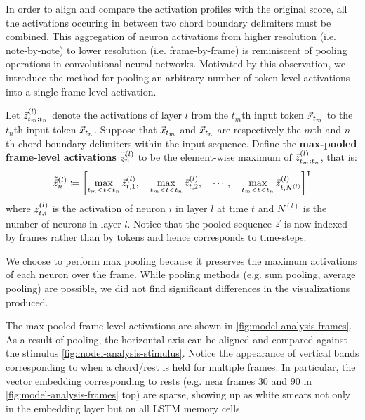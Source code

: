 In order to align and compare the activation profiles with the original score,
all the activations occuring in between two chord boundary delimiters must be
combined. This aggregation of neuron activations from higher resolution (i.e.
note-by-note) to lower resolution (i.e. frame-by-frame) is reminiscent of
pooling operations in convolutional neural networks. Motivated by
this observation, we introduce the method for pooling an arbitrary number of
token-level activations into a single frame-level activation.

Let $\vec{z}^{(l)}_{{t_m}:{t_n}}$ denote the activations of layer $l$ from the $t_m$th input token $\vec{x}_{t_m}$
to the $t_n$th input token $\vec{x}_{t_n}$. Suppose that $\vec{x}_{t_m}$ and $\vec{x}_{t_n}$ are respectively the
$m$th and $n$th chord boundary delimiters within the input sequence. Define the
\textbf{max-pooled frame-level activations} $\tilde{\vec{z}}^{(l)}_n$ to be the
element-wise maximum of $\vec{z}^{(l)}_{{t_m}:{t_n}}$, that is:
\begin{equation}
    \tilde{\vec{z}}^{(l)}_n \coloneqq \left[
        \max_{t_m < t < t_n} \vec{z}^{(l)}_{t,1},\quad
        \max_{t_m < t < t_n} \vec{z}^{(l)}_{t,2},\quad
        \cdots,\quad
        \max_{t_m < t < t_n} \vec{z}^{(l)}_{t,N^{(l)}}
    \right]^\intercal
\end{equation}
where $\vec{z}^{(l)}_{t,i}$ is the activation of neuron $i$ in layer $l$ at time $t$
and $N^{(l)}$ is the number of neurons in layer $l$. Notice that the pooled
sequence $\tilde{\vec{z}}$ is now indexed by frames rather than by tokens and hence
corresponds to time-steps.

We choose to perform max pooling because it preserves the maximum activations
of each neuron over the frame. While pooling methods (e.g. sum pooling, average
pooling) are possible, we did not find significant differences in the
visualizations produced.

The max-pooled frame-level activations are shown in
\cref{fig:model-analysis-frames}. As a result of pooling, the horizontal axis
can be aligned and compared against the stimulus
\cref{fig:model-analysis-stimulus}. Notice the appearance of vertical bands
corresponding to when a chord/rest is held for multiple frames. In particular,
the vector embedding corresponding to rests (e.g. near frames $30$ and $90$ in
\cref{fig:model-analysis-frames} top) are sparse, showing up as white smears
not only in the embedding layer but on all LSTM memory cells.

